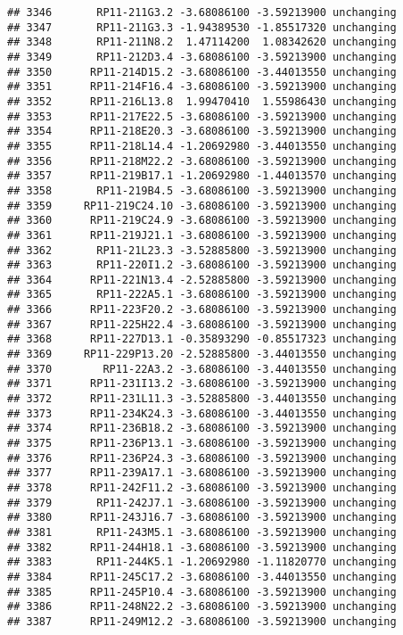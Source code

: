 \documentclass[]{article}
\begin{document}
\begin{verbatim}
## 3346       RP11-211G3.2 -3.68086100 -3.59213900 unchanging
## 3347       RP11-211G3.3 -1.94389530 -1.85517320 unchanging
## 3348       RP11-211N8.2  1.47114200  1.08342620 unchanging
## 3349       RP11-212D3.4 -3.68086100 -3.59213900 unchanging
## 3350      RP11-214D15.2 -3.68086100 -3.44013550 unchanging
## 3351      RP11-214F16.4 -3.68086100 -3.59213900 unchanging
## 3352      RP11-216L13.8  1.99470410  1.55986430 unchanging
## 3353      RP11-217E22.5 -3.68086100 -3.59213900 unchanging
## 3354      RP11-218E20.3 -3.68086100 -3.59213900 unchanging
## 3355      RP11-218L14.4 -1.20692980 -3.44013550 unchanging
## 3356      RP11-218M22.2 -3.68086100 -3.59213900 unchanging
## 3357      RP11-219B17.1 -1.20692980 -1.44013570 unchanging
## 3358       RP11-219B4.5 -3.68086100 -3.59213900 unchanging
## 3359     RP11-219C24.10 -3.68086100 -3.59213900 unchanging
## 3360      RP11-219C24.9 -3.68086100 -3.59213900 unchanging
## 3361      RP11-219J21.1 -3.68086100 -3.59213900 unchanging
## 3362       RP11-21L23.3 -3.52885800 -3.59213900 unchanging
## 3363       RP11-220I1.2 -3.68086100 -3.59213900 unchanging
## 3364      RP11-221N13.4 -2.52885800 -3.59213900 unchanging
## 3365       RP11-222A5.1 -3.68086100 -3.59213900 unchanging
## 3366      RP11-223F20.2 -3.68086100 -3.59213900 unchanging
## 3367      RP11-225H22.4 -3.68086100 -3.59213900 unchanging
## 3368      RP11-227D13.1 -0.35893290 -0.85517323 unchanging
## 3369     RP11-229P13.20 -2.52885800 -3.44013550 unchanging
## 3370        RP11-22A3.2 -3.68086100 -3.44013550 unchanging
## 3371      RP11-231I13.2 -3.68086100 -3.59213900 unchanging
## 3372      RP11-231L11.3 -3.52885800 -3.44013550 unchanging
## 3373      RP11-234K24.3 -3.68086100 -3.44013550 unchanging
## 3374      RP11-236B18.2 -3.68086100 -3.59213900 unchanging
## 3375      RP11-236P13.1 -3.68086100 -3.59213900 unchanging
## 3376      RP11-236P24.3 -3.68086100 -3.59213900 unchanging
## 3377      RP11-239A17.1 -3.68086100 -3.59213900 unchanging
## 3378      RP11-242F11.2 -3.68086100 -3.59213900 unchanging
## 3379       RP11-242J7.1 -3.68086100 -3.59213900 unchanging
## 3380      RP11-243J16.7 -3.68086100 -3.59213900 unchanging
## 3381       RP11-243M5.1 -3.68086100 -3.59213900 unchanging
## 3382      RP11-244H18.1 -3.68086100 -3.59213900 unchanging
## 3383       RP11-244K5.1 -1.20692980 -1.11820770 unchanging
## 3384      RP11-245C17.2 -3.68086100 -3.44013550 unchanging
## 3385      RP11-245P10.4 -3.68086100 -3.59213900 unchanging
## 3386      RP11-248N22.2 -3.68086100 -3.59213900 unchanging
## 3387      RP11-249M12.2 -3.68086100 -3.59213900 unchanging

\end{verbatim}
\end{document}

